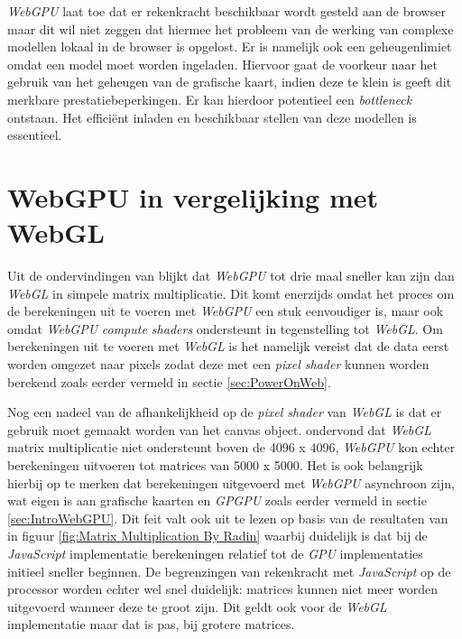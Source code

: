 \bigbreak{}

\textit{WebGPU} laat toe dat er rekenkracht beschikbaar wordt gesteld aan de browser maar dit wil niet zeggen dat hiermee het probleem van de werking van complexe modellen lokaal in de browser is opgelost. Er is namelijk ook een geheugenlimiet omdat een model moet worden ingeladen. Hiervoor gaat de voorkeur naar het gebruik van het geheugen van de grafische kaart, indien deze te klein is geeft dit merkbare prestatiebeperkingen. Er kan hierdoor potentieel een \textit{bottleneck} ontstaan. Het efficiënt inladen en beschikbaar stellen van deze modellen is essentieel.

\section{WebGPU in vergelijking met WebGL}

Uit de ondervindingen van \textcite{Radin2021} blijkt dat \textit{WebGPU} tot drie maal sneller kan zijn dan \textit{WebGL} in simpele matrix multiplicatie. Dit komt enerzijds omdat het proces om de berekeningen uit te voeren met \textit{WebGPU} een stuk eenvoudiger is, maar ook omdat \textit{WebGPU} \textit{compute shaders} ondersteunt in tegenstelling tot \textit{WebGL}. Om berekeningen uit te voeren met \textit{WebGL} is het namelijk vereist dat de data eerst worden omgezet naar pixels zodat deze met een \textit{pixel shader} kunnen worden berekend zoals eerder vermeld in sectie \ref{sec:PowerOnWeb}. 

\bigbreak{}

Nog een nadeel van de afhankelijkheid op de \textit{pixel shader} van \textit{WebGL} is dat er gebruik moet gemaakt worden van het canvas object. \textcite{Radin2021} ondervond dat \textit{WebGL} matrix multiplicatie niet ondersteunt boven de 4096 x 4096, \textit{WebGPU} kon echter berekeningen uitvoeren tot matrices van 5000 x 5000. Het is ook belangrijk hierbij op te merken dat berekeningen uitgevoerd met \textit{WebGPU} asynchroon zijn, wat eigen is aan grafische kaarten en \textit{GPGPU} zoals eerder vermeld in sectie \ref{sec:IntroWebGPU}. Dit feit valt ook uit te lezen op basis van de resultaten van \textcite{Radin2021} in figuur \ref{fig:Matrix Multiplication By Radin} waarbij duidelijk is dat bij de \textit{JavaScript} implementatie berekeningen relatief tot de \textit{GPU} implementaties initieel sneller beginnen. De begrenzingen van rekenkracht met \textit{JavaScript} op de processor worden echter wel snel duidelijk: matrices kunnen niet meer worden uitgevoerd wanneer deze te groot zijn. Dit geldt ook voor de \textit{WebGL} implementatie maar dat is pas, bij grotere matrices.

